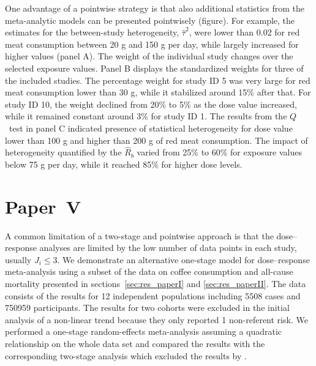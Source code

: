 \documentclass[11pt,a4paper,twoside,openany]{book}\usepackage{knitr}
\begin{document}
{One advantage of a pointwise strategy is that also additional statistics from the meta-analytic models can be presented pointwisely (figure). For example, the estimates for the between-study heterogeneity, $\hat \tau^2$, were lower than 0.02 for red meat consumption between 20 g and 150 g per day, while largely increased for higher values (panel A). The weight of the individual study changes over the selected exposure values. Panel B displays the standardized weights for three of the included studies. The percentage weight for study ID 5 was very large for red meat consumption lower than 30 g, while it stabilized around 15\% after that. For study ID 10, the weight declined from 20\% to 5\% as the dose value increased, while it remained constant around 3\% for study ID 1. The results from the $Q$~test in panel C indicated presence of statistical heterogeneity for dose value lower than 100 g and higher than 200 g of red meat consumption. The impact of heterogeneity quantified by the $\hat R_b$ varied from 25\% to 60\% for exposure values below 75 g per day, while it reached 85\% for higher dose levels.





\section{Paper~V}



A common limitation of a two-stage and pointwise approach is that the dose--response analyses are limited by the low number of data points in each study, usually $J_i \le 3$. We demonstrate an alternative one-stage model for dose--response meta-analysis using a subset of the data on coffee consumption and all-cause mortality presented in sections~\ref{sec:res_paperI} and \ref{sec:res_paperII}. The data consists of the results for 12 independent populations including 5508 cases and 750959 participants. The results for two cohorts \citep{nilsson2012traditional} were excluded in the initial analysis of a non-linear trend because they only reported 1 non-referent risk. We performed a one-stage random-effects meta-analysis assuming a quadratic relationship on the whole data set and compared the results with the corresponding two-stage analysis which excluded the results by \cite{nilsson2012traditional}. 

}
\end{document}
